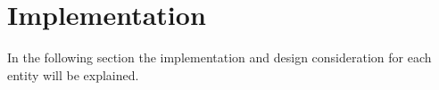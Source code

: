\section{Implementation} \label{sec:impl}
In the following section the implementation and design consideration for each entity will be explained. 





